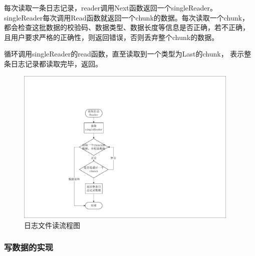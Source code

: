 \begin{enumerate}
   每次读取一条日志记录，reader调用Next函数返回一个singleReader。
   singleReader每次调用Read函数就返回一个chunk的数据。每次读取一个chunk，
   都会检查这批数据的校验码、数据类型、数据长度等信息是否正确，若不正确，
   且用户要求严格的正确性，则返回错误，否则丢弃整个chunk的数据。

   循环调用singleReader的read函数，直至读取到一个类型为Last的chunk，
   表示整条日志记录都读取完毕，返回。

   \begin{figure}[H]
	   \centering
	   \includegraphics[width=0.95\textwidth]{pdf/journal_read.pdf}
	   \caption{日志文件读流程图}
	   \label{journal_read}
   \end{figure}
   
   

   \end{enumerate}

		\subsubsection{写数据的实现}
		

